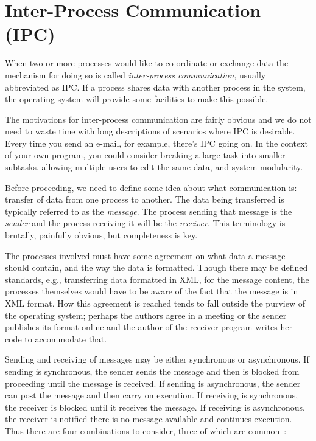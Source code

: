 




\section*{Inter-Process Communication (IPC)}
When two or more processes would like to co-ordinate or exchange data the mechanism for doing so is called \textit{inter-process communication}, usually abbreviated as IPC. If a process shares data with another process in the system, the operating system will provide some facilities to make this possible. 

The motivations for inter-process communication are fairly obvious and we do not need to waste time with long descriptions of scenarios where IPC is desirable. Every time you send an e-mail, for example, there's IPC going on. In the context of your own program, you could consider breaking a large task into smaller subtasks, allowing multiple users to edit the same data, and system modularity.

Before proceeding, we need to define some idea about what communication is: transfer of data from one process to another. The data being transferred is typically referred to as the \textit{message}. The process sending that message is the \textit{sender} and the process receiving it will be the \textit{receiver}. This terminology is brutally, painfully obvious, but completeness is key.

The processes involved must have some agreement on what data a message should contain, and the way the data is formatted. Though there may be defined standards, e.g., transferring data formatted in XML, for the message content, the processes themselves would have to be aware of the fact that the message is in XML format. How this agreement is reached tends to fall outside the purview of the operating system; perhaps the authors agree in a meeting or the sender publishes its format online and the author of the receiver program writes her code to accommodate that.

Sending and receiving of messages may be either synchronous or asynchronous. If sending is synchronous, the sender sends the message and then is blocked from proceeding until the message is received. If sending is asynchronous, the sender can post the message and then carry on execution. If receiving is synchronous, the receiver is blocked until it receives the message. If receiving is asynchronous, the receiver is notified there is no message available and continues execution. Thus there are four combinations to consider, three of which are common~\cite{mte241}:

